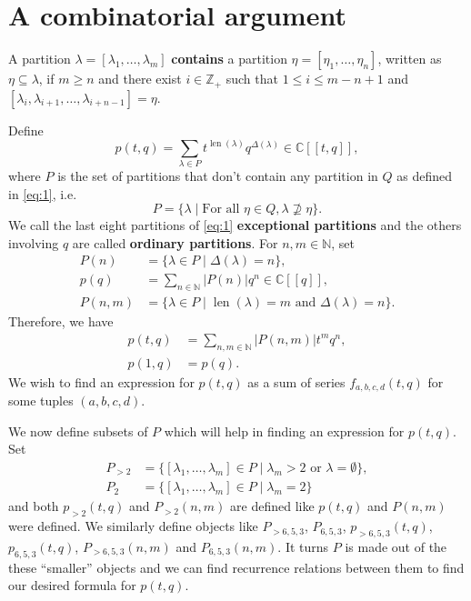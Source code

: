 \documentclass[12pt, a4paper]{article}
\theoremstyle{remark}
\DeclareMathOperator{\len}{len}
\begin{document}
\section{A combinatorial argument}
\label{sec:comb-argum}

A partition $\lambda = [\lambda_1, \dots, \lambda_m]$ \textbf{contains} a partition $\eta = [\eta_1, \dots, \eta_n]$, written as $\eta \subseteq \lambda$, if $m \ge n$ and there exist $i \in \mathbb{Z}_+$ such that $1 \le i \le m - n + 1$ and $[\lambda_i, \lambda_{i + 1}, \dots, \lambda_{i + n - 1}] = \eta$.

Define
\begin{equation*}
  p(t, q) = \sum_{\lambda \in P}t^{\len(\lambda)}q^{\Delta(\lambda)} \in \mathbb{C}[[t, q]],
\end{equation*}
where $P$ is the set of partitions that don't contain any partition in $Q$ as defined in \eqref{eq:1}, i.e.\
\begin{equation*}
  P = \{\lambda \mid \text{For all }\eta\in Q, \lambda \nsupseteq \eta\}.
\end{equation*}
We call the last eight partitions of \eqref{eq:1} \textbf{exceptional partitions} and the others involving $q$ are called \textbf{ordinary partitions}.
For $n, m \in \mathbb{N}$, set
\begin{align*}
  P(n) &= \{\lambda \in P \mid \Delta(\lambda) = n\}, \\
  p(q) &= \sum_{n \in \mathbb{N}}|P(n)|q^n \in \mathbb{C}[[q]], \\
  P(n, m) &= \{\lambda \in P \mid \len(\lambda) = m\text{ and }\Delta(\lambda) = n\}.
\end{align*}
Therefore, we have
\begin{align*}
  p(t, q) &= \sum_{n, m \in \mathbb{N}}|P(n, m)|t^mq^n, \\
  p(1, q) &= p(q).
\end{align*}
We wish to find an expression for $p(t, q)$ as a sum of series $f_{a, b, c, d}(t, q)$ for some tuples $(a, b, c, d)$.

We now define subsets of $P$ which will help in finding an expression for $p(t, q)$.
Set
\begin{align*}
  P_{>2} &= \{[\lambda_1, \dots, \lambda_m] \in P \mid \lambda_m > 2\text{ or }\lambda = \emptyset\}, \\
  P_2 &= \{[\lambda_1, \dots, \lambda_m] \in P \mid \lambda_m = 2\}
\end{align*}
and both $p_{>2}(t, q)$ and $P_{>2}(n, m)$ are defined like $p(t, q)$ and $P(n, m)$ were defined.
We similarly define objects like $P_{>6, 5, 3}$, $P_{6, 5, 3}$, $p_{>6, 5, 3}(t, q)$, $p_{6, 5, 3}(t, q)$, $P_{>6, 5, 3}(n, m)$ and $P_{6, 5, 3}(n, m)$.
It turns $P$ is made out of the these ``smaller'' objects and we can find recurrence relations between them to find our desired formula for $p(t, q)$.
\end{document}
